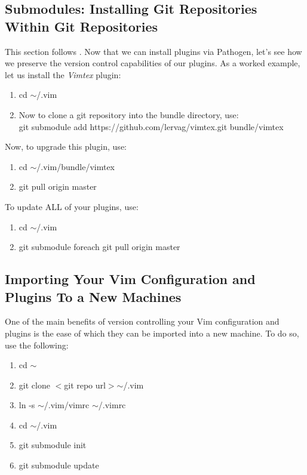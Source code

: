 \documentclass[10pt]{article}
\newcommand{\tsim}{$\sim$}
\newcommand{\tlangle}{$<$}
\newcommand{\trangle}{$>$}
\begin{document}
\subsection{Submodules: Installing Git Repositories Within Git Repositories}\label{SecSubmodules}
This section follows \cite{neil2010synchronizing}. Now that we can install
plugins via Pathogen, let's see how we preserve the version control capabilities
of our plugins. As a worked example, let us install the \textit{Vimtex} plugin:
\begin{enumerate}
    \item cd \tsim/.vim
    \item Now to clone a git repository into the bundle directory, use:\\ git
        submodule add https://github.com/lervag/vimtex.git bundle/vimtex
\end{enumerate}
Now, to upgrade this plugin, use:
\begin{enumerate}
    \item cd \tsim/.vim/bundle/vimtex
    \item git pull origin master
\end{enumerate}
To update ALL of your plugins, use:
\begin{enumerate}
    \item cd \tsim/.vim
    \item git submodule foreach git pull origin master
\end{enumerate}
\subsection{Importing Your Vim Configuration and Plugins To a New Machines}
One of the main benefits of version controlling your Vim configuration and
plugins is the ease of which they can be imported into a new machine. To do so,
use the following:
\begin{enumerate}
    \item cd \tsim
    \item git clone \tlangle git repo url\trangle \tsim/.vim
    \item ln -s \tsim/.vim/vimrc \tsim/.vimrc
    \item cd \tsim/.vim
    \item git submodule init
    \item git submodule update
\end{enumerate}
\end{document}

